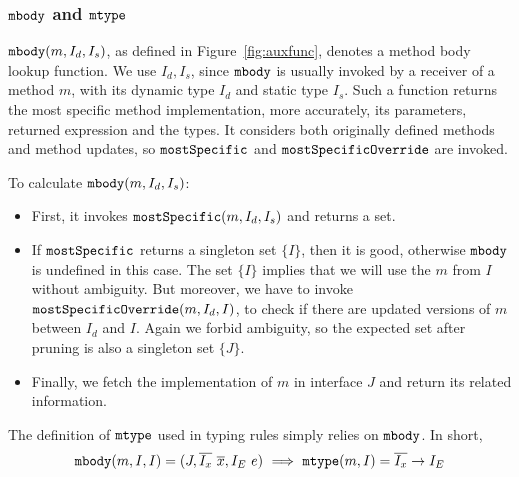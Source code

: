 \subsubsection{$\texttt{mbody}$ and $\texttt{mtype}$}

$\texttt{mbody}(m, I_d, I_s)$, as defined in Figure~\ref{fig:auxfunc}, denotes a method body lookup function.
We use $I_d, I_s$, since $\texttt{mbody}$ is usually invoked by a receiver of a method $m$, with its dynamic
type $I_d$ and static type $I_s$. Such a function returns the most specific method implementation, more
accurately, its parameters, returned expression and the types. It considers both originally defined methods and method updates, so $\texttt{mostSpecific}$ and $\texttt{mostSpecificOverride}$ are invoked.

To calculate $\texttt{mbody}(m, I_d, I_s)$:
\begin{itemize}
	\item First, it invokes $\texttt{mostSpecific}(m, I_d, I_s)$ and returns a set.
	\item If $\texttt{mostSpecific}$ returns a singleton set $\{I\}$, then it is good, otherwise $\texttt{mbody}$ is undefined in
	this case. The set $\{I\}$ implies that we will use the $m$ from $I$ without ambiguity. But moreover, we have to invoke $\texttt{mostSpecificOverride}(m, I_d, I)$, to check if there are updated versions of $m$ between $I_d$ and $I$. Again we forbid ambiguity, so the expected set after pruning is also a singleton set $\{J\}$.
	\item Finally, we fetch the implementation of $m$ in interface $J$ and return its related information.
\end{itemize}
The definition of $\texttt{mtype}$ used in typing rules simply relies on $\texttt{mbody}$. In short,
$$\texttt{mbody}(m, I, I) = (J, \overline{I_x}\ \overline{x}, I_E\ e) \ \Longrightarrow\ \texttt{mtype}(m, I) = \overline{I_x}\rightarrow I_E$$

